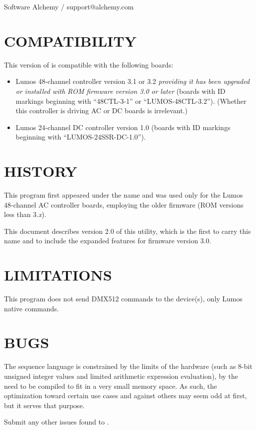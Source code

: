 Software Alchemy / support@alchemy.com
\section*{COMPATIBILITY}


This version of 
is compatible with the following boards:
\begin{itemize}
\item
Lumos 48-channel controller version 3.1 or 3.2
\emph{providing it has been upgraded or installed with ROM firmware version 3.0 or later}
(boards with ID markings beginning with ``48CTL-3-1'' or ``LUMOS-48CTL-3.2'').  (Whether this controller is
driving AC or DC boards is irrelevant.)
\item
Lumos 24-channel DC controller version 1.0 (boards with ID markings beginning with
``LUMOS-24SSR-DC-1.0'').
\end{itemize}
\section*{HISTORY}



This program first appeared under the name
and was used only for the Lumos 48-channel AC controller boards, employing the
older firmware (ROM versions less than
3.\emph{x}).


This document describes version 2.0 of this utility, which is the first to carry
this name and to include the expanded features for firmware version 3.0.
\section*{LIMITATIONS}


This program does not send DMX512 commands to the device(s), only Lumos native
commands.
\section*{BUGS}


The sequence language is constrained by the limits of the hardware (such as 8-bit
unsigned integer values and limited arithmetic expression evaluation), 
by the need to 
be compiled to fit in a very small memory space.  As such, the optimization
toward certain use cases and against others may seem odd at first, but it serves that
purpose.


Submit any other issues found to 
.
